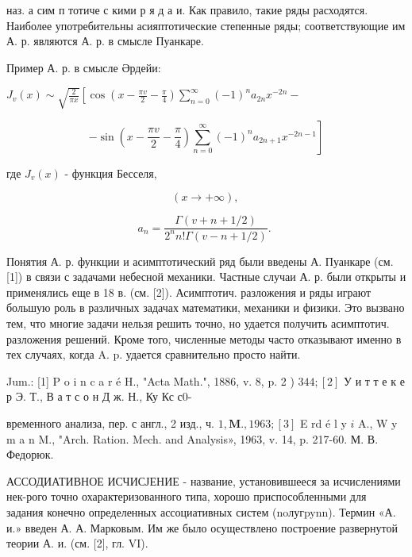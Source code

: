 \documentclass[10pt]{article}
\begin{document}
наз. а сим п тотиче с кими р я д а и. Как правило, такие ряды расходятся. Наиболее употребительны асияптотические степенные ряды; соответствующие им А. р. являются А. р. в смысле Пуанкаре.



Пример А. р. в смысле Әрдейи:



$J_{v}(x) \sim \sqrt{\frac{2}{\pi x}}\left[\cos \left(x-\frac{\pi v}{2}-\frac{\pi}{4}\right) \sum_{n=0}^{\infty}(-1)^{n} a_{2 n} x^{-2 n}-\right.$



\[

\left.-\sin \left(x-\frac{\pi v}{2}-\frac{\pi}{4}\right) \sum_{n=0}^{\infty}(-1)^{n} a_{2 n+1} x^{-2 n-1}\right]

\]



где $J_{v}(x)$ - функция Бесселя,



\[

(x \rightarrow+\infty) \text {, }

\]



\[

a_{n}=\frac{\Gamma(v+n+1 / 2)}{2^{n} n ! \Gamma(v-n+1 / 2)} \text {. }

\]



Понятия А. р. функции и асимптотический ряд были введены А. Пуанкаре (см. [1]) в связи с задачами небесной механики. Частные случаи А. р. были открыты и применялись еще в 18 в. (см. [2]). Асимптотич. разложения и ряды играют большую роль в различных задачах математики, механики и физики. Это вызвано тем, что многие задачи нельзя решить точно, но удается получить асимптотич. разложения решений. Кроме того, численные методы часто отказывают именно в тех случаях, когда A. p. удается сравнительно просто найти.



Jum.: [1] P o i n c a r é H., "Acta Math.", 1886, v. 8, p. 2 ) $344 ;[2]$ У и т т е к е р Э. Т., В а т с о н Д ж. Н., Ку Кс с0-

временного анализа, пер. с англ., 2 изд., ч. $1, \mathbf{M} ., 1963 ;[3]$ E rd é l y $i$ A., W y m a n M., "Arch. Ration. Mech. and Analysis», 1963, v. 14, p. 217-60. М. В. Федорюк.



АССОДИАТИВНОЕ ИСЧИСЈЕНИЕ - название, установившееся за исчислениями нек-рого точно охарактеризованного типа, хорошо приспособленными для задания конечно определенных ассоциативных систем (noлугpynn). Термин «А. и.» введен А. А. Марковым. Им же было осуществлено построение развернутой теории А. и. (см. [2], гл. VI).
\end{document}
